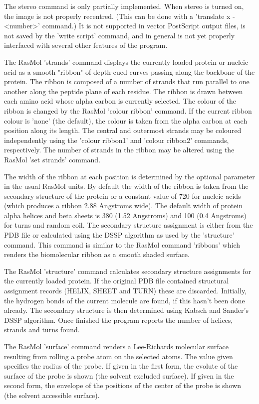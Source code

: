 The stereo command is only partially
implemented. When stereo is turned on, the image is not properly
recentred. (This can be done with a
'translate x -<number>'
 command.)
It is not supported in vector PostScript output files, is not
saved by the
'write script'
command, and in
general is not yet properly interfaced with several other
features of the program.

The RasMol
'strands'
command displays the currently loaded protein or nucleic acid as a
smooth "ribbon" of depth-cued curves passing along the backbone of the
protein. The ribbon is composed of a number of strands that run parallel
to one another along the peptide plane of each residue. The ribbon is
drawn between each amino acid whose alpha carbon is currently selected.
The colour of the ribbon is changed by the RasMol
'colour ribbon'
command. If the current ribbon colour is
'none'
(the default), the colour is taken from the alpha carbon at each
position along its length. The central and outermost
strands may be coloured independently using the
'colour ribbon1'
and
'colour ribbon2'
commands, respectively. The number of strands in the ribbon may be
altered using the RasMol
'set strands'
command.

The width of the ribbon at each position is determined by the optional
parameter in the usual RasMol units. By default the width of the ribbon
is taken from the secondary structure of the protein or a constant value
of 720 for nucleic acids (which produces a ribbon 2.88 Angstroms wide).
The default width of protein alpha helices and beta sheets is 380 (1.52
Angstroms) and 100 (0.4 Angstroms) for turns and random coil. The
secondary structure assignment is either from the PDB file or calculated
using the DSSP algorithm as used by the
'structure'
command. This command is similar to the RasMol command
'ribbons'
which renders the biomolecular ribbon as a smooth shaded surface.

The RasMol
'structure'
command calculates secondary structure assignments
for the currently loaded protein. If the original PDB file contained
structural assignment records (HELIX, SHEET and TURN) these are discarded.
Initially, the hydrogen bonds of the current molecule are found, if this
hasn't been done already. The secondary structure is then determined using
Kabsch and Sander's DSSP algorithm. Once finished the program reports the
number of helices, strands and turns found.

The RasMol
'surface'
command renders a Lee-Richards molecular surface resulting
from rolling a probe atom on the selected atoms.
The value given specifies the radius of the probe.
If given in the first form, the evolute of the surface
of the probe is shown (the solvent excluded surface).
If given in the second form, the envelope of the
positions of the center of the probe is shown
(the solvent accessible surface).

